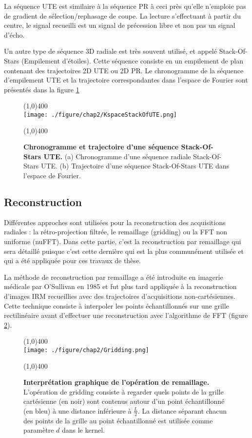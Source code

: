 La séquence UTE est similaire à la séquence PR à ceci près qu'elle n'emploie pas 
de gradient de sélection/rephasage de coupe. La lecture s'effectuant à partir du centre, le signal recueilli est un signal de précession libre et non pas un signal d'écho.

Un autre type de séquence 3D radiale est très souvent utilisé, et appelé Stack-Of-Stars (Empilement d'étoiles). Cette séquence consiste en un empilement de plan contenant des trajectoires 2D UTE ou 2D PR. Le chronogramme de la séquence d'empilement UTE et la trajectoire correspondantes dans l'espace de Fourier sont présentés dans la figure \ref{fig:KspaceStackOfUTE}

\begin{figure}[H]
\centering
\line(1,0){400} \\
\texttt{[image: ./figure/chap2/KspaceStackOfUTE.png]}
\caption[Chronogramme et trajectoire d'une séquence Stack-Of-Stars UTE.]{\label{fig:KspaceStackOfUTE} \textbf{Chronogramme et trajectoire d'une séquence Stack-Of-Stars UTE.} (a) Chronogramme d'une séquence radiale Stack-Of-Stars UTE. (b) Trajectoire d'une séquence Stack-Of-Stars UTE dans l'espace de Fourier. } 
\line(1,0){400} \\
\end{figure}

\subsection{Reconstruction}

\label{subsec:reconstruction}
Différentes approches sont utilisées pour la reconstruction des acquisitions radiales : la rétro-projection filtrée, le remaillage (gridding) ou la FFT non uniforme (nuFFT). Dans cette partie, c'est la reconstruction par remaillage qui sera détaillé puisque c'est cette dernière qui est la plus communément utilisée et qui a été appliquée pour ces travaux de thèse.

La méthode de reconstruction par remaillage a été introduite en imagerie médicale par O'Sullivan en 1985 \cite{o1985fast} et fut plus tard appliquée à la reconstruction d'images IRM recueillies avec des trajectoires d'acquisitions non-cartésiennes. Cette technique consiste à interpoler les points échantillonnés sur une grille rectilinéaire avant d'effectuer une reconstruction avec l'algorithme de FFT (figure \ref{fig:Gridding}).

\begin{figure}[h]
\centering
\line(1,0){400} \\
\texttt{[image: ./figure/chap2/Gridding.png]}
\caption[Interprétation graphique de l'opération de remaillage.]{\label{fig:Gridding} \textbf{Interprétation graphique de l'opération de remaillage.} L'opération de gridding consiste à regarder quels points de la grille cartésienne (en noir) sont contenus autour d'un point échantillonné (en bleu) à une distance inférieure à $\frac{L}{2}$. La distance séparant chacun des points de la grille au point échantillonné est utilisée comme paramètre $d$ dans le kernel.} 
\line(1,0){400} \\
\end{figure}

